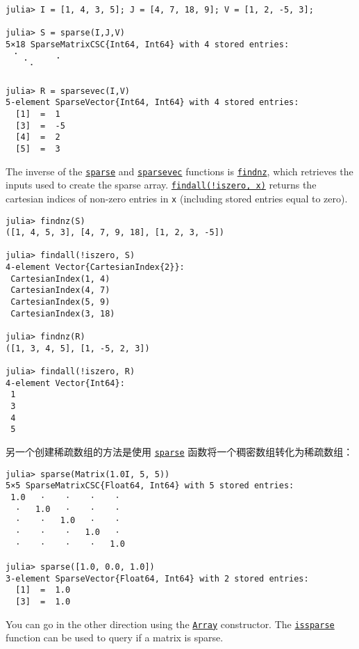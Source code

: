 \begin{verbatim}
julia> I = [1, 4, 3, 5]; J = [4, 7, 18, 9]; V = [1, 2, -5, 3];

julia> S = sparse(I,J,V)
5×18 SparseMatrixCSC{Int64, Int64} with 4 stored entries:
⠀⠈⠀⡀⠀⠀⠀⠀⠠
⠀⠀⠀⠀⠁⠀⠀⠀⠀

julia> R = sparsevec(I,V)
5-element SparseVector{Int64, Int64} with 4 stored entries:
  [1]  =  1
  [3]  =  -5
  [4]  =  2
  [5]  =  3
\end{verbatim}



The inverse of the \hyperlink{10167157011990389788}{\texttt{sparse}} and \hyperlink{13364181309585533450}{\texttt{sparsevec}} functions is \hyperlink{15430174447643444721}{\texttt{findnz}}, which retrieves the inputs used to create the sparse array. \hyperlink{16067208921941164599}{\texttt{findall(!iszero, x)}} returns the cartesian indices of non-zero entries in \texttt{x} (including stored entries equal to zero).




\begin{verbatim}
julia> findnz(S)
([1, 4, 5, 3], [4, 7, 9, 18], [1, 2, 3, -5])

julia> findall(!iszero, S)
4-element Vector{CartesianIndex{2}}:
 CartesianIndex(1, 4)
 CartesianIndex(4, 7)
 CartesianIndex(5, 9)
 CartesianIndex(3, 18)

julia> findnz(R)
([1, 3, 4, 5], [1, -5, 2, 3])

julia> findall(!iszero, R)
4-element Vector{Int64}:
 1
 3
 4
 5
\end{verbatim}



另一个创建稀疏数组的方法是使用  \hyperlink{10167157011990389788}{\texttt{sparse}} 函数将一个稠密数组转化为稀疏数组：




\begin{verbatim}
julia> sparse(Matrix(1.0I, 5, 5))
5×5 SparseMatrixCSC{Float64, Int64} with 5 stored entries:
 1.0   ⋅    ⋅    ⋅    ⋅
  ⋅   1.0   ⋅    ⋅    ⋅
  ⋅    ⋅   1.0   ⋅    ⋅
  ⋅    ⋅    ⋅   1.0   ⋅
  ⋅    ⋅    ⋅    ⋅   1.0

julia> sparse([1.0, 0.0, 1.0])
3-element SparseVector{Float64, Int64} with 2 stored entries:
  [1]  =  1.0
  [3]  =  1.0
\end{verbatim}



You can go in the other direction using the \hyperlink{15492651498431872487}{\texttt{Array}} constructor. The \hyperlink{14062776301471954766}{\texttt{issparse}} function can be used to query if a matrix is sparse.




